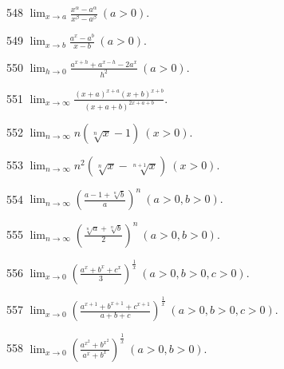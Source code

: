 \begin{prob}[S]{548}
$\displaystyle \lim_{x\to a} \frac{x^\alpha - a^\alpha}{x^\beta - a^\beta} \ (a > 0).$
\end{prob}

\begin{prob}[S]{549}
$\displaystyle \lim_{x\to b} \frac{a^x - a^b}{x-b} \ (a > 0).$
\end{prob}

\begin{prob}[S]{550}
$\displaystyle \lim_{h\to 0} \frac{a^{x+h} + a^{x-h} - 2a^x}{h^2} \ (a > 0).$
\end{prob}

\begin{prob}[S]{551}
$\displaystyle \lim_{x\to \infty} \frac{(x+a)^{x+a}(x+b)^{x+b}}{(x+a+b)^{2x+a+b}}.$
\end{prob}

\begin{prob}[S]{552}
$\displaystyle \lim_{n\to \infty} n(\sqrt[n]{x} - 1) \ (x > 0).$
\end{prob}

\begin{prob}[S]{553}
$\displaystyle \lim_{n\to \infty} n^2(\sqrt[n]{x} - \sqrt[n+1]{x}) \ (x > 0).$
\end{prob}

\begin{prob}[S]{554}
$\displaystyle \lim_{n\to \infty} \left(\frac{a - 1 + \sqrt[n]{b}}{a}\right)^n \ (a > 0, b > 0).$
\end{prob}

\begin{prob}[S]{555}
$\displaystyle \lim_{n\to \infty} \left(\frac{\sqrt[n]{a} + \sqrt[n]{b}}{2}\right)^n \ (a > 0, b > 0).$
\end{prob}

\begin{prob}[S]{556}
$\displaystyle \lim_{x\to 0} \left(\frac{a^x + b^x + c^x}{3}\right)^{\frac{1}{x}} \ (a > 0, b > 0, c > 0).$
\end{prob}

\begin{prob}[S]{557}
$\displaystyle \lim_{x\to 0} \left(\frac{a^{x+1} + b^{x+1} + c^{x+1}}{a+b+c}\right)^{\frac{1}{x}} \ (a > 0, b > 0, c > 0).$
\end{prob}

\begin{prob}[S]{558}
$\displaystyle \lim_{x\to 0} \left(\frac{a^{x^2} + b^{x^2}}{a^x + b^x}\right)^{\frac{1}{x}} \ (a > 0, b > 0).$
\end{prob}

